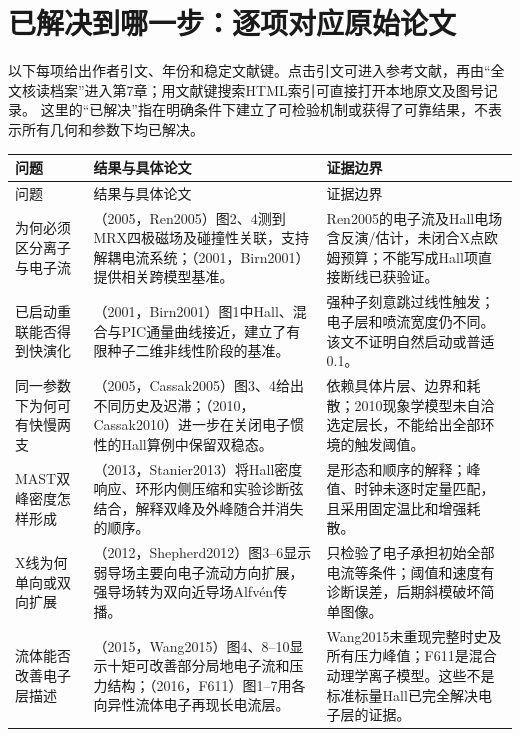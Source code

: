 \section{已解决到哪一步：逐项对应原始论文}
\label{sec:guide-solved}
以下每项给出作者引文、年份和稳定文献键。点击引文可进入参考文献，再由“全文核读档案”进入第7章；用文献键搜索HTML索引可直接打开本地原文及图号记录。
这里的“已解决”指在明确条件下建立了可检验机制或获得了可靠结果，不表示所有几何和参数下均已解决。

\begin{longtable}{P{29mm}P{63mm}P{56mm}}
\toprule 问题 & 结果与具体论文 & 证据边界\\\midrule\endfirsthead
\toprule 问题 & 结果与具体论文 & 证据边界\\\midrule\endhead
为何必须区分离子与电子流 &
\citet{Ren2005}（2005，Ren2005）图2、4测到MRX四极磁场及碰撞性关联，支持解耦电流系统；\citet{Birn2001}（2001，Birn2001）提供相关跨模型基准。 &
Ren2005的电子流及Hall电场含反演/估计，未闭合X点欧姆预算；不能写成Hall项直接断线已获验证。\\
已启动重联能否得到快演化 &
\citet{Birn2001}（2001，Birn2001）图1中Hall、混合与PIC通量曲线接近，建立了有限种子二维非线性阶段的基准。 &
强种子刻意跳过线性触发；电子层和喷流宽度仍不同。该文不证明自然启动或普适0.1。\\
同一参数下为何可有快慢两支 &
\citet{Cassak2005}（2005，Cassak2005）图3、4给出不同历史及迟滞；\citet{Cassak2010}（2010，Cassak2010）进一步在关闭电子惯性的Hall算例中保留双稳态。 &
依赖具体片层、边界和耗散；2010现象学模型未自洽选定层长，不能给出全部环境的触发阈值。\\
MAST双峰密度怎样形成 &
\citet{Stanier2013}（2013，Stanier2013）将Hall密度响应、环形内侧压缩和实验诊断弦结合，解释双峰及外峰随合并消失的顺序。 &
是形态和顺序的解释；峰值、时钟未逐时定量匹配，且采用固定温比和增强耗散。\\
X线为何单向或双向扩展 &
\citet{Shepherd2012}（2012，Shepherd2012）图3--6显示弱导场主要向电子流动方向扩展，强导场转为双向近导场Alfvén传播。 &
只检验了电子承担初始全部电流等条件；阈值和速度有诊断误差，后期斜模破坏简单图像。\\
流体能否改善电子层描述 &
\citet{Wang2015}（2015，Wang2015）图4、8--10显示十矩可改善部分局地电子流和压力结构；\citet{F611}（2016，F611）图1--7用各向异性流体电子再现长电流层。 &
Wang2015未重现完整时史及所有压力峰值；F611是混合动理学离子模型。这些不是标准标量Hall已完全解决电子层的证据。\\
\bottomrule
\end{longtable}

